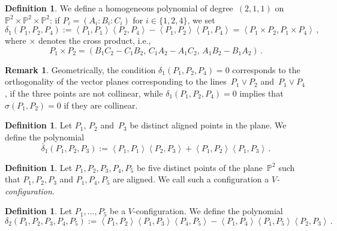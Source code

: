 \documentclass[a4paper, 11pt, reqno]{amsart}
\theoremstyle{plain}
\theoremstyle{definition}
\newtheorem{definition}[lemma]{Definition}
\newtheorem{rmk}[lemma]{Remark}
\newcommand{\p}{\mathbb{P}}
\newcommand{\scl}[2]{\left\langle {#1}, {#2} \right\rangle}
\begin{document}
\begin{definition}
\label{definition:delta1}
We define a homogeneous polynomial of degree~$(2,1,1)$ on $\p^2 \times \p^2 \times \p^2$:
if $P_i = (A_i: B_i: C_i)$ for $i \in \{1, 2, 4\}$, we set
%
\[
  \delta_1(P_1, P_2, P_4) :=
  \scl{P_1}{P_1} \scl{P_2}{P_4} - \scl{P_1}{P_2}\scl{P_1}{P_4} =
  \scl{P_1\times P_2}{P_1 \times P_4} \,,
\]
%
where $\times$ denotes the cross product, i.e.,
%
\[
  P_1 \times P_2 = 
  (B_1 C_2 - C_1 B_2, \, C_1 A_2 - A_1 C_2, \, A_1 B_2 - B_1 A_2) \,.
\]
%
\end{definition}

\begin{rmk}
\label{rmk:delta1_meaning}
Geometrically, the condition $\delta_1(P_1, P_2, P_4) = 0$ corresponds to the orthogonality of the vector planes corresponding to the lines~$P_1 \vee P_2$ and~$P_1 \vee P_4$, if the three points are not collinear, while
$\delta_1(P_1, P_2, P_4) = 0$ implies that $\sigma (P_1,P_2)=0$ if they are collinear.
\end{rmk}

\begin{definition}
\label{definition:delta1b}
Let $P_1$, $P_2$ and~$P_3$ be distinct aligned points in the plane.
We define the polynomial
%
\[
  \overline{\delta}_1(P_1, P_2, P_3) :=
  \scl{P_1}{P_1} \scl{P_2}{P_3} + \scl{P_1}{P_2}\scl{P_1}{P_3} \,.
\]
%
\end{definition}

\begin{definition}
\label{definition:Vconf}
Let $P_1, P_2, P_3, P_4, P_5$ be five distinct points of the plane~$\p^2$
such that $P_1, P_2, P_3$ and $P_1, P_4, P_5$ are aligned.
We call such a configuration a \emph{$V$-configuration}.
\end{definition}

\begin{definition}
Let $P_1, \dots, P_5$ be a $V$-configuration.
We define the polynomial
%
\[
  \delta_2(P_1, P_2, P_3, P_4, P_5) :=
  \scl{P_1}{P_2} \scl{P_1}{P_3} \scl{P_4}{P_5} -
  \scl{P_1}{P_4} \scl{P_1}{P_5} \scl{P_2}{P_3} \,.
\]
%
\end{definition}
\end{document}
